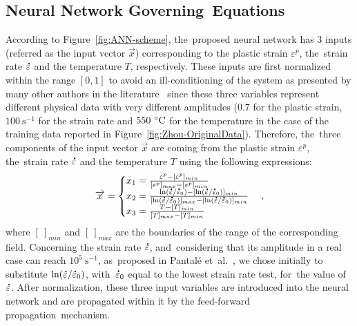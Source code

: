 \documentclass[algorithms,article,accept,pdftex,oneauthors]{Definitions/mdpi}
\DeclareRobustCommand{\mdot}[1]{\accentset{\mbox{\bfseries .}}{#1}}
\DeclareRobustCommand{\ps}{\text{s}^{-1}}
\begin{document}
\subsection{Neural Network Governing~Equations}\label{sec:ANN-equations}

According to Figure~\ref{fig:ANN-scheme}, the~proposed neural network has $3$ inputs (referred as the input vector $\overrightarrow{x}$) corresponding to the plastic strain $\varepsilon^p$, the~strain rate $\mdot\varepsilon$ and the temperature $T$, respectively.
These inputs are first normalized within the range $[0,1]$ to avoid an ill-conditioning of the system as presented by many other authors in the literature~\cite{Lin-2008, Lu-2011} since these three variables represent different physical data with very different amplitudes ($0.7$ for the plastic strain, $100~\ps$ for the strain rate and $550~\celsius$ for the temperature in the case of the training data reported in Figure~\ref{fig:Zhou-OriginalData}).
Therefore, the~three components of the input vector $\overrightarrow{x}$ are coming from the plastic strain $\varepsilon^p$, the~strain rate $\mdot\varepsilon$ and the temperature $T$ using the following expressions:
\begin{equation}
\overrightarrow{x}=
\begin{cases}
x_1 = \frac{\varepsilon^p - [\varepsilon^p]_{min}}{[\varepsilon^p]_{max} - [\varepsilon^p]_{min}}\\
x_2 = \frac{\ln(\mdot\varepsilon/\mdot\varepsilon_0)-[\ln(\mdot\varepsilon/\mdot\varepsilon_0)]_{min}}{[\ln(\mdot\varepsilon/\mdot\varepsilon_0)]_{max}-[\ln(\mdot\varepsilon/\mdot\varepsilon_0)]_{min}}\\
x_3 = \frac{T-[T]_{min}}{[T]_{max}-[T]_{min}}
\end{cases},
\label{eq:CR1}
\end{equation}
where $[~]_{min}$ and $[~]_{max}$  are the boundaries of the range of the corresponding field.
Concerning the strain rate $\mdot\varepsilon$, and~considering that its amplitude in a real case can reach $10^5~\ps$, as~proposed in Pantalé et~al.~\cite{Pantale-2021}, we chose initially to substitute $\ln(\mdot\varepsilon/\mdot\varepsilon_0)$, with~$\mdot\varepsilon_0$ equal to the lowest strain rate test, for~the value of $\mdot\varepsilon$.
After normalization, these three input variables are introduced into the neural network and are propagated within it by the feed-forward propagation~mechanism.
\end{document}
